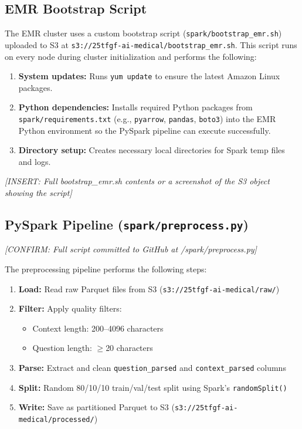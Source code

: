 \documentclass[11pt,a4paper]{article}
\begin{document}
\subsection{EMR Bootstrap Script}

The EMR cluster uses a custom bootstrap script (\texttt{spark/bootstrap\_emr.sh}) uploaded to S3 at \texttt{s3://25tfgf-ai-medical/bootstrap\_emr.sh}. This script runs on every node during cluster initialization and performs the following:

\begin{enumerate}
    \item \textbf{System updates:} Runs \texttt{yum update} to ensure the latest Amazon Linux packages.
    \item \textbf{Python dependencies:} Installs required Python packages from \texttt{spark/requirements.txt} (e.g., \texttt{pyarrow}, \texttt{pandas}, \texttt{boto3}) into the EMR Python environment so the PySpark pipeline can execute successfully.
    \item \textbf{Directory setup:} Creates necessary local directories for Spark temp files and logs.
\end{enumerate}

\textit{[INSERT: Full bootstrap\_emr.sh contents or a screenshot of the S3 object showing the script]}

\subsection{PySpark Pipeline (\texttt{spark/preprocess.py})}

\textit{[CONFIRM: Full script committed to GitHub at /spark/preprocess.py]}

The preprocessing pipeline performs the following steps:

\begin{enumerate}
    \item \textbf{Load:} Read raw Parquet files from S3 (\texttt{s3://25tfgf-ai-medical/raw/})
    \item \textbf{Filter:} Apply quality filters:
    \begin{itemize}[nosep]
        \item Context length: 200--4096 characters
        \item Question length: $\geq$20 characters
    \end{itemize}
    \item \textbf{Parse:} Extract and clean \texttt{question\_parsed} and \texttt{context\_parsed} columns
    \item \textbf{Split:} Random 80/10/10 train/val/test split using Spark's \texttt{randomSplit()}
    \item \textbf{Write:} Save as partitioned Parquet to S3 (\texttt{s3://25tfgf-ai-medical/processed/})
\end{enumerate}
\end{document}
